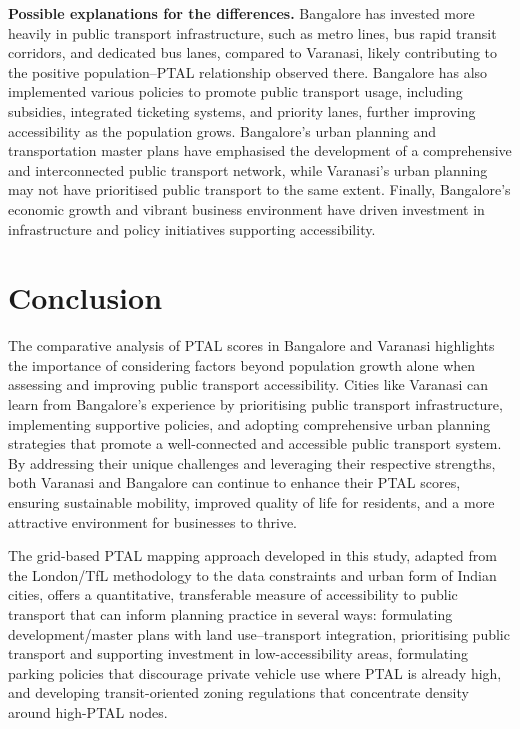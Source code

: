 \documentclass[11pt]{article}
\begin{document}
\textbf{Possible explanations for the differences.} Bangalore has invested more heavily in
public transport infrastructure, such as metro lines, bus rapid transit corridors, and dedicated
bus lanes, compared to Varanasi, likely contributing to the positive population--PTAL relationship
observed there. Bangalore has also implemented various policies to promote public transport
usage, including subsidies, integrated ticketing systems, and priority lanes, further improving
accessibility as the population grows. Bangalore's urban planning and transportation master
plans have emphasised the development of a comprehensive and interconnected public transport
network, while Varanasi's urban planning may not have prioritised public transport to the same
extent. Finally, Bangalore's economic growth and vibrant business environment have driven
investment in infrastructure and policy initiatives supporting accessibility.

\section{Conclusion}

The comparative analysis of PTAL scores in Bangalore and Varanasi highlights the importance of
considering factors beyond population growth alone when assessing and improving public transport
accessibility. Cities like Varanasi can learn from Bangalore's experience by prioritising public
transport infrastructure, implementing supportive policies, and adopting comprehensive urban
planning strategies that promote a well-connected and accessible public transport system. By
addressing their unique challenges and leveraging their respective strengths, both Varanasi and
Bangalore can continue to enhance their PTAL scores, ensuring sustainable mobility, improved
quality of life for residents, and a more attractive environment for businesses to thrive.

The grid-based PTAL mapping approach developed in this study, adapted from the London/TfL
methodology to the data constraints and urban form of Indian cities, offers a quantitative,
transferable measure of accessibility to public transport that can inform planning practice in
several ways: formulating development/master plans with land use--transport integration,
prioritising public transport and supporting investment in low-accessibility areas, formulating
parking policies that discourage private vehicle use where PTAL is already high, and developing
transit-oriented zoning regulations that concentrate density around high-PTAL nodes.
\end{document}

